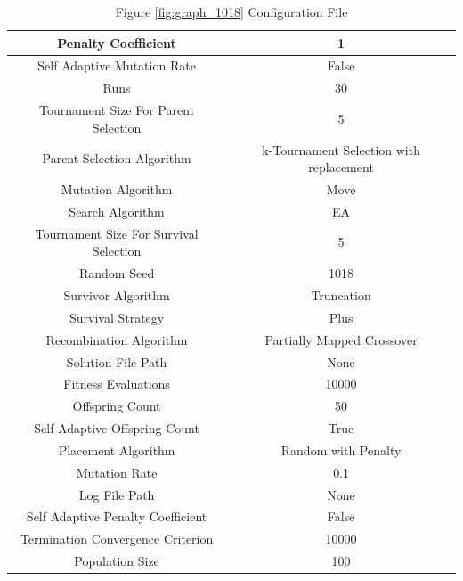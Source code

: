 \documentclass{standalone}
\begin{document}
\begin{table}[!htb]
	\centering
	\caption{Figure \ref{fig:graph_1018} Configuration File}
	\label{tab:graph_1018}
	\begin{tabular}{| c | c |}
		\hline
		Penalty Coefficient		& 1		 \\
		\hline
		Self Adaptive Mutation Rate		& False		 \\
		\hline
		Runs		& 30		 \\
		\hline
		Tournament Size For Parent Selection		& 5		 \\
		\hline
		Parent Selection Algorithm		& k-Tournament Selection with replacement		 \\
		\hline
		Mutation Algorithm		& Move		 \\
		\hline
		Search Algorithm		& EA		 \\
		\hline
		Tournament Size For Survival Selection		& 5		 \\
		\hline
		Random Seed		& 1018		 \\
		\hline
		Survivor Algorithm		& Truncation		 \\
		\hline
		Survival Strategy		& Plus		 \\
		\hline
		Recombination Algorithm		& Partially Mapped Crossover		 \\
		\hline
		Solution File Path		& None		 \\
		\hline
		Fitness Evaluations		& 10000		 \\
		\hline
		Offspring Count		& 50		 \\
		\hline
		Self Adaptive Offspring Count		& True		 \\
		\hline
		Placement Algorithm		& Random with Penalty		 \\
		\hline
		Mutation Rate		& 0.1		 \\
		\hline
		Log File Path		& None		 \\
		\hline
		Self Adaptive Penalty Coefficient		& False		 \\
		\hline
		Termination Convergence Criterion		& 10000		 \\
		\hline
		Population Size		& 100		 \\
		\hline
	\end{tabular}
\end{table}
\end{document}

